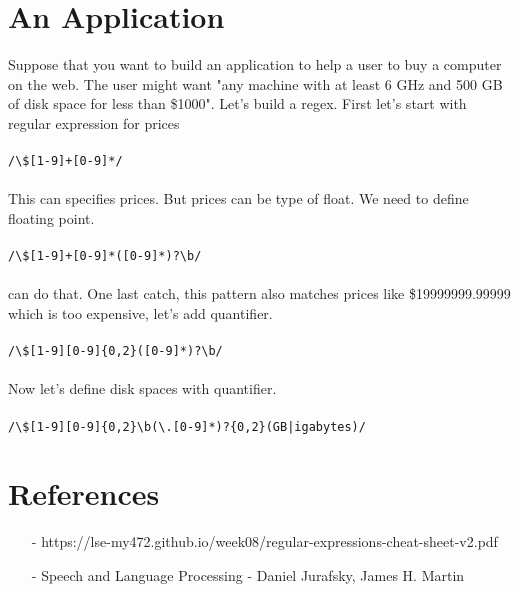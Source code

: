 \documentclass[11pt]{article}
\begin{document}
\section*{An Application}
\hspace*{1cm} Suppose that you want to build an application to help a user to buy a computer on the web. The user might want "any machine with at least 6 GHz and 500 GB of disk space for less than \$1000". Let's build a regex. First let's start with regular expression for prices\\\\
\texttt{/\textbackslash \$[1-9]+[0-9]*/}\\\\
This can specifies prices. But prices can be type of float. We need to define floating point.\\\\
\texttt{/\textbackslash \$[1-9]+[0-9]*(\.[0-9]*)?\textbackslash b/}\\\\
can do that. One last catch, this pattern also matches prices like \$19999999.99999 which is too expensive, let's add quantifier.\\\\
\texttt{/\textbackslash \$[1-9][0-9]\{0,2\}(\.[0-9]*)?\textbackslash b/}\\\\
Now let's define disk spaces with quantifier.\\\\
\texttt{/\textbackslash \$[1-9][0-9]\{0,2\}\textbackslash b(\textbackslash .[0-9]*)?\textvisiblespace[1-4][0-9]\{0,2\}(GB|\textvisiblespace[Gg]igabytes)/}

\section*{References}
\begin{itemize}
\item[-] https://lse-my472.github.io/week08/regular-expressions-cheat-sheet-v2.pdf
\item[-] Speech and Language Processing - Daniel Jurafsky, James H. Martin
\end{itemize}
\end{document}
